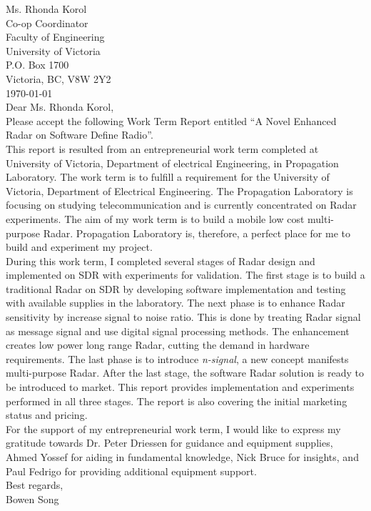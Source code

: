 \documentclass[letterpaper, 12 pt, conference]{report}
\numberwithin{figure}{section}
\begin{document}
{Ms. Rhonda Korol\\
Co-op Coordinator\\
Faculty of Engineering\\
University of Victoria\\
P.O. Box 1700\\
Victoria, BC, V8W 2Y2\\

\today\\

Dear Ms. Rhonda Korol,\\

Please accept the following Work Term Report entitled \enquote{A Novel Enhanced Radar on Software Define Radio}.\\

This report is resulted from an entrepreneurial work term completed at University of Victoria, Department of electrical Engineering, in Propagation Laboratory. The work term is to fulfill a requirement for the University of Victoria, Department of Electrical Engineering. The Propagation Laboratory is focusing on studying telecommunication and is currently concentrated on Radar experiments. The aim of my work term is to build a mobile low cost multi-purpose Radar. Propagation Laboratory is, therefore, a perfect place for me to build and experiment my project. \\

During this work term, I completed several stages of Radar design and implemented on SDR with experiments for validation. The first stage is to build a traditional Radar on SDR by developing software implementation and testing with available supplies in the laboratory. The next phase is to enhance Radar sensitivity by increase signal to noise ratio. This is done by treating Radar signal as message signal and use digital signal processing methods. The enhancement creates low power long range Radar, cutting the demand in hardware requirements. The last phase is to introduce \textit{n-signal}, a new concept manifests multi-purpose Radar. After the last stage, the software Radar solution is ready to be introduced to market. This report provides implementation and experiments performed in all three stages. The report is also covering the initial marketing status and pricing.\\

For the support of my entrepreneurial work term, I would like to express my gratitude towards Dr. Peter Driessen for guidance and equipment supplies, Ahmed Yossef for aiding in fundamental knowledge, Nick Bruce for insights, and Paul Fedrigo for providing additional equipment support.\\

Best regards,\\

Bowen Song

} %
\clearpage
\end{document}
